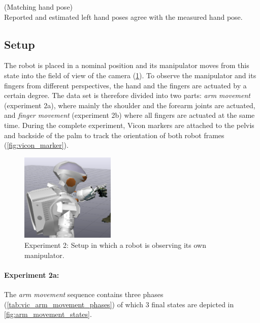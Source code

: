 \begin{hypothesis}(Matching hand pose)\\
Reported and estimated left hand poses agree with the measured hand pose.
\label{hyp:matching_hand_pose}
\end{hypothesis}


\subsection{Setup}

The robot is placed in a nominal position and its manipulator moves from this state into the field of view of the camera (\cref{fig:vicon_free_movement}). To observe the manipulator and its fingers from different perspectives, the hand and the fingers are actuated by a certain degree. The data set is therefore divided into two parts: \textit{arm movement} (experiment 2a), where mainly the shoulder and the forearm joints are actuated, and \textit{finger movement} (experiment 2b) where all fingers are actuated at the same time. During the complete experiment, Vicon markers are attached to the pelvis and backside of the palm to track the orientation of both robot frames (\cref{fig:vicon_marker}).

\begin{figure}[h]
\captionsetup{width=0.4\textwidth}
\centering
\includegraphics[width=0.4\textwidth]{images/eval_vicon/sequence/setting.png}
\caption[Experiment 2: Setup]{Experiment 2: Setup in which a robot is observing its own manipulator.}
\label{fig:vicon_free_movement}
\end{figure}

\paragraph{Experiment 2a:}
The \textit{arm movement} sequence contains three phases (\cref{tab:vic_arm_movement_phases}) of which 3 final states are depicted in \cref{fig:arm_movement_states}.

